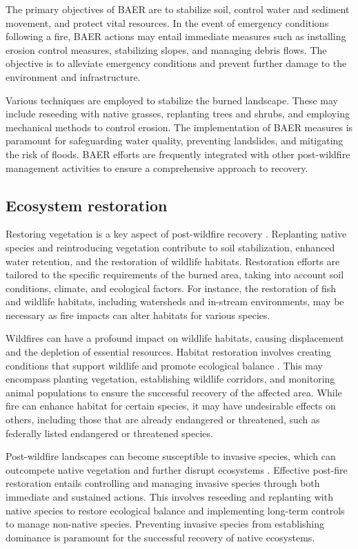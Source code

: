 \documentclass[
  12 pt,
]{Nemilov}
\begin{document}
The primary objectives of BAER are to stabilize soil, control water and sediment movement, and protect vital resources. In the event of emergency conditions following a fire, BAER actions may entail immediate measures such as installing erosion control measures, stabilizing slopes, and managing debris flows. The objective is to alleviate emergency conditions and prevent further damage to the environment and infrastructure.

Various techniques are employed to stabilize the burned landscape. These may include reseeding with native grasses, replanting trees and shrubs, and employing mechanical methods to control erosion. The implementation of BAER measures is paramount for safeguarding water quality, preventing landslides, and mitigating the risk of floods. BAER efforts are frequently integrated with other post-wildfire management activities to ensure a comprehensive approach to recovery.

\subsection{Ecosystem restoration}\label{ecosystem-restoration}

Restoring vegetation is a key aspect of post-wildfire recovery \citep{anderson1995ecological, jackson2009ecological}. Replanting native species and reintroducing vegetation contribute to soil stabilization, enhanced water retention, and the restoration of wildlife habitats. Restoration efforts are tailored to the specific requirements of the burned area, taking into account soil conditions, climate, and ecological factors. For instance, the restoration of fish and wildlife habitats, including watersheds and in-stream environments, may be necessary as fire impacts can alter habitats for various species.

Wildfires can have a profound impact on wildlife habitats, causing displacement and the depletion of essential resources. Habitat restoration involves creating conditions that support wildlife and promote ecological balance \citep{miller2007habitat}. This may encompass planting vegetation, establishing wildlife corridors, and monitoring animal populations to ensure the successful recovery of the affected area. While fire can enhance habitat for certain species, it may have undesirable effects on others, including those that are already endangered or threatened, such as federally listed endangered or threatened species.

Post-wildfire landscapes can become susceptible to invasive species, which can outcompete native vegetation and further disrupt ecosystems \citep{johnson2006role, keeley2006fire}. Effective post-fire restoration entails controlling and managing invasive species through both immediate and sustained actions. This involves reseeding and replanting with native species to restore ecological balance and implementing long-term controls to manage non-native species. Preventing invasive species from establishing dominance is paramount for the successful recovery of native ecosystems.
\end{document}
